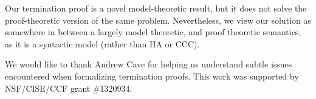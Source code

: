 \documentclass[preprint,nonatbib]{sigplanconf}
\numberwithin{mysubdfn}{mydfn}
\begin{document}
Our termination proof is a novel model-theoretic result, but it
does not solve the proof-theoretic version of the same problem.
Nevertheless, we view our solution as somewhere in between a largely
model theoretic, and proof theoretic semantics, as it is a syntactic
model (rather than HA or CCC).


\acks

We would like to thank Andrew Cave for helping us understand subtle
issues encountered when formalizing termination proofs.
This work was supported by NSF/CISE/CCF grant \#1320934.



\end{document}

